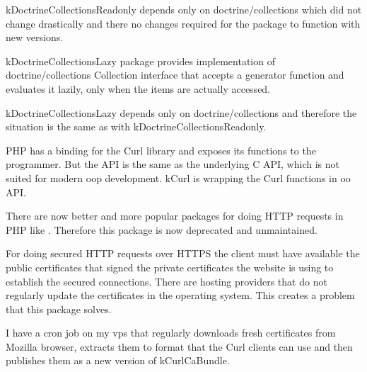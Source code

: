 \gls{kDoctrineCollectionsReadonly} depends only on doctrine/collections which did not change drastically and there no changes required for the package to function with new versions.

 \label{sec:state:doctrine-collections-lazy}

\Gls{kDoctrineCollectionsLazy} package provides implementation of doctrine/collections Collection interface that accepts a generator function and evaluates it lazily, only when the items are actually accessed.

\gls{kDoctrineCollectionsLazy} depends only on doctrine/collections and therefore the situation is the same as with \gls{kDoctrineCollectionsReadonly}.




 \label{sec:state:curl}

PHP has a binding for the Curl library and exposes its functions to the programmer. But the API is the same as the underlying C API, which is not suited for modern \gls{oop} development. \gls{kCurl} is wrapping the Curl functions in \gls{oo} API.

There are now better and more popular packages for doing HTTP requests in PHP like . Therefore this package is now deprecated and unmaintained.

 \label{sec:state:curl-ca-bundle}

For doing secured HTTP requests over HTTPS the client must have available the public certificates that signed the private certificates the website is using to establish the secured connections. There are hosting providers that do not regularly update the certificates in the operating system. This creates a problem that this package solves.

I have a cron job on my \gls{vps} that regularly downloads fresh certificates from Mozilla browser, extracts them to format that the Curl clients can use and then publishes them as a new version of \gls{kCurlCaBundle}.

